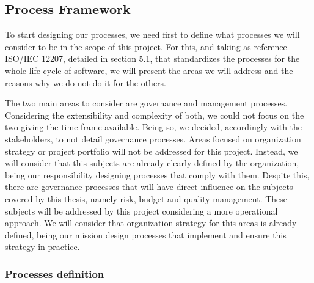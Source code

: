 \subsection{Process Framework}

To start designing our processes, we need first to define what processes we will consider to be in the scope of this project. For this, and taking as reference ISO/IEC 12207, detailed in section 5.1, that standardizes the processes for the whole life cycle of software, we will present the areas we will address and the reasons why we do not do it for the others.\par
The two main areas to consider are governance and management processes. Considering the extensibility and complexity of both, we could not focus on the two giving the time-frame available. Being so, we decided, accordingly with the stakeholders, to not detail governance processes. Areas focused on organization strategy or project portfolio will not be addressed for this project. Instead, we will consider that this subjects are already clearly defined by the organization, being our responsibility designing processes that comply with them. 
Despite this, there are governance processes that will have direct influence on the subjects covered by this thesis, namely risk, budget and quality management. These subjects will be addressed by this project considering a more operational approach. We will consider that organization strategy for this areas is already defined, being our mission design processes that implement and ensure this strategy in practice.\par



\subsubsection{Processes definition}


